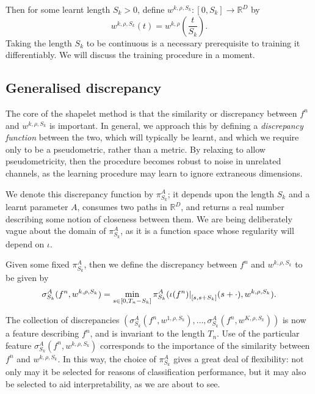 \documentclass{article}
\theoremstyle{plain}
\theoremstyle{definition}
\newcommand{\reals}{\mathbb{R}}
\newcommand{\restr}[2]{{\left.\kern-\nulldelimiterspace #1 \right|_{#2}}}
\begin{document}
	Then for some learnt length $S_k > 0$, define $w^{k, \rho, S_k} \colon [0, S_k] \to \reals^D$ by
	\begin{equation*}
	w^{k, \rho, S_k}(t) = w^{k, \rho}\left(\frac{t}{S_k}\right).
	\end{equation*}
	Taking the length $S_k$ to be continuous is a necessary prerequisite to training it differentiably. We will discuss the training procedure in a moment.
	
	\subsection{Generalised discrepancy}
	The core of the shapelet method is that the similarity or discrepancy between $f^n$ and $w^{k, \rho, S_k}$ is important. In general, we approach this by defining a \emph{discrepancy function} between the two, which will typically be learnt, and which we require only to be a pseudometric, rather than a metric. By relaxing to allow pseudometricity, then the procedure becomes robust to noise in unrelated channels, as the learning procedure may learn to ignore extraneous dimensions.
	
	We denote this discrepancy function by $\pi^A_{S_k}$; it depends upon the length $S_k$ and a learnt parameter $A$, consumes two paths in $\reals^D$, and returns a real number describing some notion of closeness between them. We are being deliberately vague about the domain of $\pi^A_{S_k}$, as it is a function space whose regularity will depend on $\iota$.	
	
	Given some fixed $\pi^A_{S_k}$, then we define the discrepancy between $f^n$ and $w^{k, \rho, S_k}$ to be given by
	\begin{equation}\label{eq:new-sigma}
	\sigma^A_{S_k}(f^n, w^{k, \rho, S_k}) = \min_{s \in [0, T_n - S_k]} \pi^A_{S_k}(\restr{\iota(f^n)}{[s, s + S_k]}(s + \cdot), w^{k, \rho, S_k}).
	\end{equation}
	
	The collection of discrepancies $(\sigma^A_{S_k}(f^n, w^{1, \rho, S_k}), \ldots, \sigma^A_{S_k}(f^n, w^{K, \rho, S_k}))$ is now a feature describing $f^n$, and is invariant to the length $T_n$. Use of the particular feature $\sigma^A_{S_k}(f^n, w^{k, \rho, S_k})$ corresponds to the importance of the similarity between $f^n$ and $w^{k, \rho, S_k}$. In this way, the choice of $\pi^A_{S_k}$ gives a great deal of flexibility: not only may it be selected for reasons of classification performance, but it may also be selected to aid interpretability, as we are about to see.
	
\end{document}
